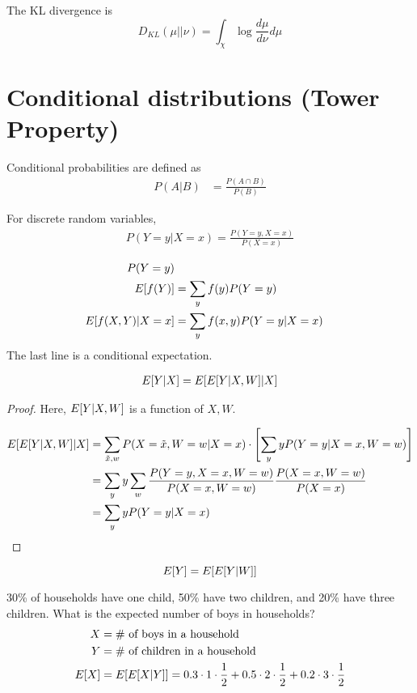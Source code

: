 \documentclass[twoside]{article}
\begin{document}
\begin{definition}
  The KL divergence is
  \[ D_{KL}(\mu || \nu) = \int_\chi \log \frac{d\mu}{d\nu} d\mu \]
\end{definition}

\section{Conditional distributions (Tower Property)}

Conditional probabilities are defined as
\begin{align*}
  P(A | B) &= \frac{P(A \cap B)}{P(B)} 
\end{align*}

For discrete random variables,
\begin{align*}
  P(Y = y | X = x) = \frac{P(Y = y, X = x)}{P(X = x)}
\end{align*}

\begin{align*}
  P(Y = y) \\
  E[f(Y)] &= \sum_y f(y) P(Y = y) \\
  E[f(X, Y) | X = x] &= \sum_y f(x, y) P(Y = y | X = x)
\end{align*}
The last line is a conditional expectation.

\begin{theorem}
\begin{align*}
  E[Y | X] = E[E[Y | X, W] | X]
\end{align*}
\end{theorem}
\begin{proof}
  Here, $E[Y | X, W]$ is a function of $X, W$. 

  \begin{align*}
    E[E[Y | X, W] | X] &= \sum_{\tilde{x}, w} P(X = \tilde{x}, W = w | X = x)
    \cdot \left[ \sum_y yP(Y = y | X = x, W = w)\right] \\
    &= \sum_y y \sum_w \frac{P(Y = y, X = x, W = w)}{P(X = x, W = w)}  \frac{P(X =
    x, W = w)}{P(X = x)} \\
    &= \sum_y y P(Y = y | X = x)
  \end{align*}
\end{proof}
\begin{corollary}
  \[E[Y] = E[E[Y | W]]\]
\end{corollary}

\begin{example}
30\% of households have one child, 50\% have two children, and 20\% have
three children. What is the expected number of boys in households?
\begin{align*}
  X &= \text{\# of boys in a household} \\
  Y &= \text{\# of children in a household} \\
  E[X] &= E[E[X | Y]]= 0.3 \cdot 1 \cdot \frac{1}{2} + 0.5 \cdot 2 \cdot 
  \frac{1}{2} + 0.2 \cdot 3 \cdot \frac{1}{2}
\end{align*}
\end{example}
\end{document}
